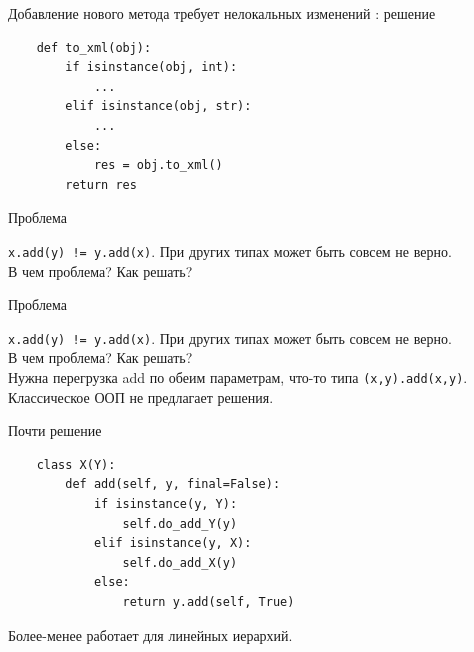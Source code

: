 \documentclass{article}
\begin{document}
\begin{center} Добавление нового метода требует нелокальных изменений : решение \end{center}
\begin{lstlisting}
    def to_xml(obj):
        if isinstance(obj, int):
            ...
        elif isinstance(obj, str):
            ...
        else:
            res = obj.to_xml()
        return res
\end{lstlisting}
\newpage

\begin{center} Проблема \end{center}
    \lstinline|x.add(y) != y.add(x)|. При других типах может быть совсем не верно. \\
    В чем проблема? Как решать?
\newpage

\begin{center} Проблема \end{center}
    \lstinline|x.add(y) != y.add(x)|. При других типах может быть совсем не верно. \\
    В чем проблема? Как решать? \\
    Нужна перегрузка add по обеим параметрам, что-то типа
    \lstinline!(x,y).add(x,y)!.  Классическое ООП не предлагает решения.
\newpage

\begin{center} Почти решение \end{center}
\begin{lstlisting}
    class X(Y):
        def add(self, y, final=False):
            if isinstance(y, Y):
                self.do_add_Y(y)
            elif isinstance(y, X):
                self.do_add_X(y)
            else:
                return y.add(self, True)
\end{lstlisting}
Более-менее работает для линейных иерархий.
\newpage
\end{document}

